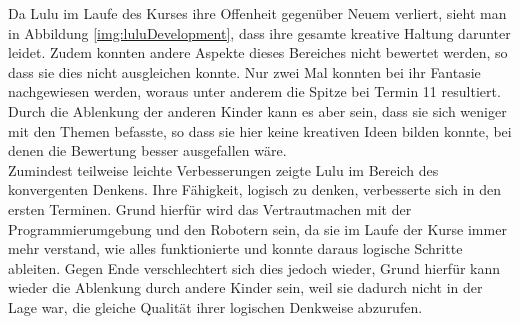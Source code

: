 Da Lulu im Laufe des Kurses ihre Offenheit gegenüber Neuem verliert, sieht man in Abbildung \ref{img:luluDevelopment}, dass ihre gesamte kreative Haltung darunter leidet. Zudem konnten andere Aspekte dieses Bereiches nicht bewertet werden, so dass sie dies nicht ausgleichen konnte. Nur zwei Mal konnten bei ihr Fantasie nachgewiesen werden, woraus unter anderem die Spitze bei Termin 11 resultiert. Durch die Ablenkung der anderen Kinder kann es aber sein, dass sie sich weniger mit den Themen befasste, so dass sie hier keine kreativen Ideen bilden konnte, bei denen die Bewertung besser ausgefallen wäre.\\
Zumindest teilweise leichte Verbesserungen zeigte Lulu im Bereich des konvergenten Denkens. Ihre Fähigkeit, logisch zu denken, verbesserte sich in den ersten Terminen. Grund hierfür wird das Vertrautmachen mit der Programmierumgebung und den Robotern sein, da sie im Laufe der Kurse immer mehr verstand, wie alles funktionierte und konnte daraus logische Schritte ableiten. Gegen Ende verschlechtert sich dies jedoch wieder, Grund hierfür kann wieder die Ablenkung durch andere Kinder sein, weil sie dadurch nicht in der Lage war, die gleiche Qualität ihrer logischen Denkweise abzurufen. 




